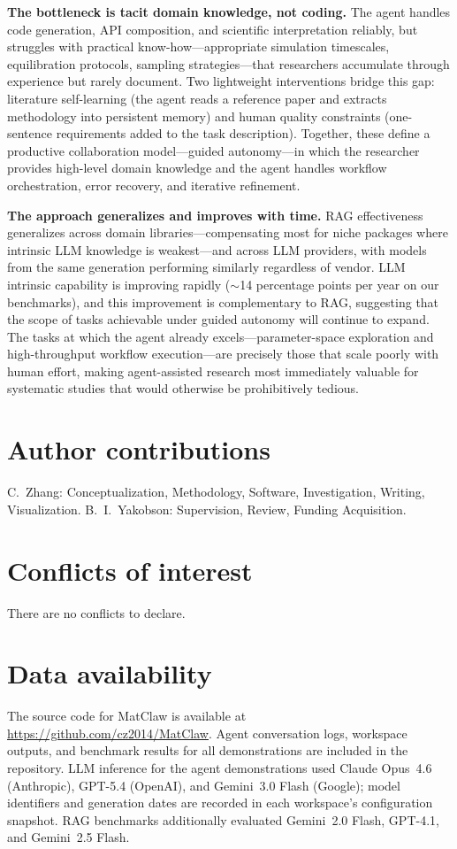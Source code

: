 \documentclass{article}
\begin{document}
\textbf{The bottleneck is tacit domain knowledge, not coding.}
The agent handles code generation, API composition, and scientific interpretation reliably, but struggles with practical know-how---appropriate simulation timescales, equilibration protocols, sampling strategies---that researchers accumulate through experience but rarely document.
Two lightweight interventions bridge this gap: literature self-learning (the agent reads a reference paper and extracts methodology into persistent memory) and human quality constraints (one-sentence requirements added to the task description).
Together, these define a productive collaboration model---guided autonomy---in which the researcher provides high-level domain knowledge and the agent handles workflow orchestration, error recovery, and iterative refinement.

\textbf{The approach generalizes and improves with time.}
RAG effectiveness generalizes across domain libraries---compensating most for niche packages where intrinsic LLM knowledge is weakest---and across LLM providers, with models from the same generation performing similarly regardless of vendor.
LLM intrinsic capability is improving rapidly (${\sim}$14 percentage points per year on our benchmarks), and this improvement is complementary to RAG, suggesting that the scope of tasks achievable under guided autonomy will continue to expand.
The tasks at which the agent already excels---parameter-space exploration and high-throughput workflow execution---are precisely those that scale poorly with human effort, making agent-assisted research most immediately valuable for systematic studies that would otherwise be prohibitively tedious.

\section*{Author contributions}

C.~Zhang: Conceptualization, Methodology, Software, Investigation, Writing, Visualization.
B.~I.~Yakobson: Supervision, Review, Funding Acquisition.

\section*{Conflicts of interest}
There are no conflicts to declare.

\section*{Data availability}
The source code for MatClaw is available at \url{https://github.com/cz2014/MatClaw}.
Agent conversation logs, workspace outputs, and benchmark results for all demonstrations are included in the repository.
LLM inference for the agent demonstrations used Claude Opus~4.6 (Anthropic), GPT-5.4 (OpenAI), and Gemini~3.0 Flash (Google); model identifiers and generation dates are recorded in each workspace's configuration snapshot.
RAG benchmarks additionally evaluated Gemini~2.0 Flash, GPT-4.1, and Gemini~2.5 Flash.
\end{document}
